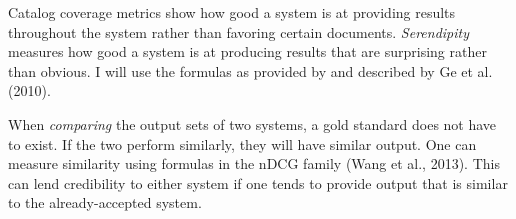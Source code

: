 Catalog coverage metrics show how good a system is at providing results throughout the system rather than favoring certain documents. \textit{Serendipity} measures how good a system is at producing results that are surprising rather than obvious. I will use the formulas as provided by and described by Ge et al. (2010).

When \textit{comparing} the output sets of two systems, a gold standard does not have to exist. If the two perform similarly, they will have similar output. One can measure similarity using formulas in the nDCG family (Wang et al., 2013). This can lend credibility to either system if one tends to provide output that is similar to the already-accepted system.
